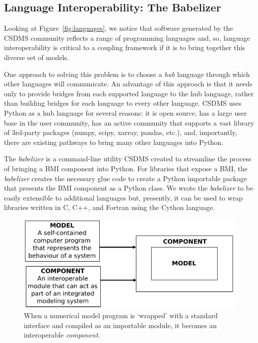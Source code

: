 \documentclass{article} %
\begin{document}
\subsection{Language Interoperability: The Babelizer}
\label{sec:babelizer}

Looking at Figure~\ref{fig:languages},
we notice that software generated by the CSDMS community
reflects a range of programming languages and, so, language interoperability is critical
to a coupling framework if it is to bring together this diverse set of models.

One approach to solving this problem is to choose a \textit{hub} language through
which other languages will communicate. An advantage of this approach is that
it needs only to provide bridges from each supported language to the hub
language, rather than building bridges for each language to every
other language. CSDMS uses Python as a hub language for several reasons: it is open source, has a large user
base in the user community, has an active community that supports a vast library
of 3rd-party packages (numpy, scipy, xarray, pandas, etc.), and,
importantly, there are existing pathways to bring many other languages into Python.

The \textit{babelizer} is a command-line utility CSDMS created to streamline the
process of bringing a BMI component into Python. For libraries that expose a
BMI, the \textit{babelizer} creates the necessary glue code to create a Python
importable package that presents the BMI component as a Python class. We
wrote the \textit{babelizer} to be easily extensible to additional languages but,
presently, it can be used to wrap libraries written in C, C++, and Fortran
using the Cython language.








\begin{figure}[h!]
\centering
\includegraphics[scale=0.5]{Figures/model_to_component.pdf}
\caption{When a numerical model program is `wrapped' with a standard interface and compiled as an importable module, it becomes an interoperable \textit{component}.}
\label{fig:component}
\end{figure}
\end{document}
